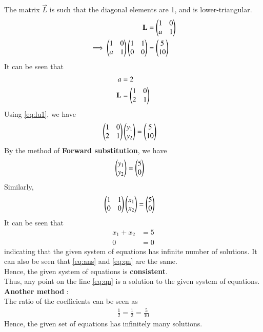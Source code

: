 \documentclass[journal]{IEEEtran}
\begin{document}
The matrix $\vec{L}$ is such that the diagonal elements are 1, and is lower-triangular.
\begin{align}
	\mathbf{L} &= \begin{pmatrix}1 & 0 \\ a & 1\end{pmatrix} \\
	\implies \begin{pmatrix}1 & 0 \\ a & 1\end{pmatrix} \begin{pmatrix}1 & 1 \\ 0 & 0\end{pmatrix} &= \begin{pmatrix}5 \\ 10\end{pmatrix}
\end{align}
It can be seen that
\begin{align}
	a &= 2 \\
	\mathbf{L} &= \begin{pmatrix}1 & 0 \\ 2 & 1\end{pmatrix}
\end{align}
Using \eqref{eq:lu1}, we have
\begin{align}
	\begin{pmatrix}1 & 0 \\ 2 & 1\end{pmatrix} \begin{pmatrix}y_{1} \\ y_{2}\end{pmatrix} &= \begin{pmatrix}5 \\ 10\end{pmatrix}
\end{align}
By the method of \textbf{Forward substitution}, we have
\begin{align}
	\begin{pmatrix}y_{1} \\ y_{2}\end{pmatrix} &= \begin{pmatrix}5 \\ 0\end{pmatrix}
\end{align}
Similarly, 
\begin{align}
	\begin{pmatrix}1 & 1 \\ 0 & 0\end{pmatrix} \begin{pmatrix}x_{1} \\ x_{2}\end{pmatrix} &= \begin{pmatrix}5 \\ 0\end{pmatrix} \label{eq:ans2}
\end{align}
It can be seen that
\begin{align}
	x_{1} + x_{2} &= 5 \label{eq:ans} \\
	0 &= 0
\end{align}
indicating that the given system of equations has infinite number of solutions. It can also be seen that \eqref{eq:ans} and \eqref{eq:qn} are the same. \\
Hence, the given system of equations is \textbf{consistent}. \\
Thus, any point on the line \eqref{eq:qn} is a solution to the given system of equations. \\
\textbf{Another method} : \\
The ratio of the coefficients can be seen as
\begin{align}
	\frac{1}{2} = \frac{1}{2} = \frac{5}{10}
\end{align}
Hence, the given set of equations has infinitely many solutions. \\
\end{document}
